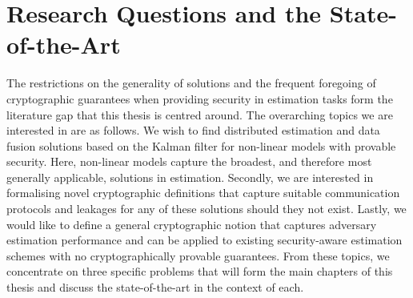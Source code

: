 % 
%                                             
%                                             
%                                             
% 

\section{Research Questions and the State-of-the-Art}\label{sec:intro:sota}
The restrictions on the generality of solutions and the frequent foregoing of cryptographic guarantees when providing security in estimation tasks form the literature gap that this thesis is centred around. The overarching topics we are interested in are as follows. We wish to find distributed estimation and data fusion solutions based on the Kalman filter for non-linear models with provable security. Here, non-linear models capture the broadest, and therefore most generally applicable, solutions in estimation. Secondly, we are interested in formalising novel cryptographic definitions that capture suitable communication protocols and leakages for any of these solutions should they not exist. Lastly, we would like to define a general cryptographic notion that captures adversary estimation performance and can be applied to existing security-aware estimation schemes with no cryptographically provable guarantees. From these topics, we concentrate on three specific problems that will form the main chapters of this thesis and discuss the state-of-the-art in the context of each.

% 
% 

